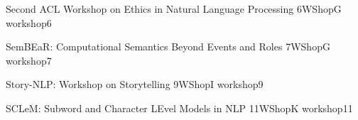  \begin{wsschedule}
   {Second ACL Workshop on Ethics in Natural Language Processing}
   {6}{WShopG}
   {workshop6}
   {\WShopLocG}
   
 \end{wsschedule}


%   

\begin{wsschedule}
  {SemBEaR: Computational Semantics Beyond Events and Roles}
  {7}{WShopG}
  {workshop7}
  {\WShopLocG}
  
\end{wsschedule}

%   

\begin{wsschedule}
  {Story-NLP: Workshop on Storytelling}
  {9}{WShopI}
  {workshop9}
  {\WShopLocI}
  
\end{wsschedule}

%   


\begin{wsschedule}
  {SCLeM: Subword and Character LEvel Models in NLP}
  {11}{WShopK}
  {workshop11}
  {\WShopLocK}
  
\end{wsschedule}

%   

